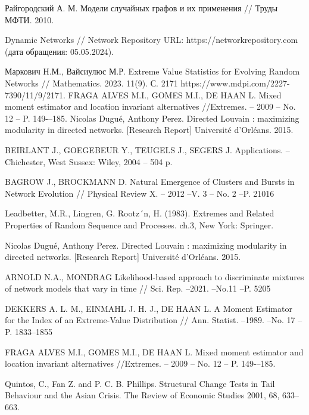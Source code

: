 \documentclass[a4paper,12pt]{article}
\begin{document}
\begin{thebibliography}{0}
 Райгородский А. М. Модели случайных графов и их применения // Труды МФТИ. 2010.

 Dynamic Networks // Network Repository URL: https://networkrepository.com (дата обращения: 05.05.2024).

 Маркович Н.М., Вайсиулюс М.Р. Extreme Value Statistics for Evolving Random Networks // Mathematics. 2023. 11(9). С. 2171 https://www.mdpi.com/2227-7390/11/9/2171.
FRAGA ALVES M.I., GOMES M.I., DE HAAN L. Mixed moment estimator and location invariant alternatives //Extremes. – 2009 – No. 12 – P. 149-–185.
 Nicolas Dugué, Anthony Perez. Directed Louvain : maximizing modularity in directed networks. [Research Report] Université d'Orléans. 2015.

 BEIRLANT J., GOEGEBEUR Y., TEUGELS J., SEGERS J. Applications. – Chichester, West Sussex: Wiley, 2004 – 504 p.

 BAGROW J., BROCKMANN D. Natural Emergence of Clusters and Bursts in Network Evolution // Physical Review X. – 2012 –V. 3 – No. 2 –P. 21016

 Leadbetter, M.R., Lingren, G. Rootz´n, H. (1983). Extremes and Related Properties of Random Sequence and Processes. ch.3, New York: Springer.


 Nicolas Dugué, Anthony Perez. Directed Louvain : maximizing modularity in directed networks. [Research Report] Université d'Orléans. 2015.

 ARNOLD N.A., MONDRAG Likelihood-based approach to discriminate mixtures of network models that vary in time // Sci. Rep. –2021. –No.11 –P. 5205

 DEKKERS A. L. M., EINMAHL J. H. J., DE HAAN L. A Moment Estimator for the Index of an Extreme-Value Distribution // Ann. Statist. –1989. –No. 17 –P. 1833–1855

 FRAGA ALVES M.I., GOMES M.I., DE HAAN L. Mixed moment estimator and location invariant alternatives //Extremes. – 2009 – No. 12 – P. 149-–185.

 Quintos, C., Fan Z. and P. C. B. Phillips. Structural Change Tests in Tail Behaviour and the Asian Crisis. The Review of Economic Studies 2001, 68, 633–663.


\end{thebibliography}
\end{document}
